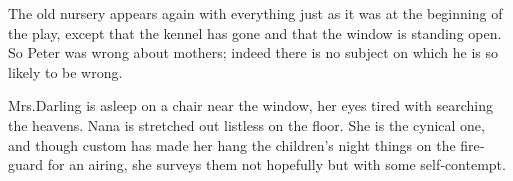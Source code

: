 

\begin{stagedir}
The old nursery appears again with everything just as it was at the beginning of the play,
except that the kennel has gone and that the window is standing open.
So Peter was wrong about mothers;
indeed there is no subject on which he is so likely to be wrong.

Mrs.\@ Darling is asleep on a chair near the window, her eyes tired with searching the heavens.
Nana is stretched out listless on the floor.
She is the cynical one,
and though custom has made her hang the children’s night things on the fire‐guard for an airing,
she surveys them not hopefully but with some self‐contempt.
\end{stagedir}

